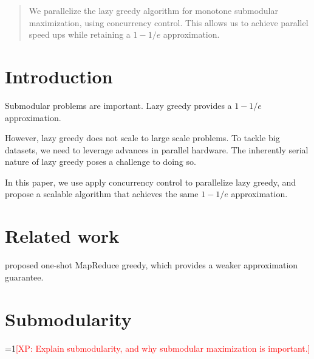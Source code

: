 \documentclass{article}
\newcommand{\Comments}{1}
\newcommand{\note}[2]{\ifnum\Comments=1\textcolor{#1}{#2}\fi}
\newcommand{\xinghao}[1]{\note{red}{[XP: #1]}}
\begin{document}
 


\begin{abstract} 
We parallelize the lazy greedy algorithm for monotone submodular maximization, using concurrency control.
This allows us to achieve parallel speed ups while retaining a $1-1/e$ approximation.
\end{abstract} 

\section{Introduction}
\label{sec:intro}
Submodular problems are important.
Lazy greedy provides a $1-1/e$ approximation.

However, lazy greedy does not scale to large scale problems.
To tackle big datasets, we need to leverage advances in parallel hardware.
The inherently serial nature of lazy greedy poses a challenge to doing so.

In this paper, we use apply concurrency control to parallelize lazy greedy, and propose a scalable algorithm that achieves the same $1-1/e$ approximation.

\section{Related work}
\label{sec:relatedwork}
\cite{Mirzasoleiman2013} proposed one-shot MapReduce greedy, which provides a weaker approximation guarantee.

\section{Submodularity}
\label{sec:submodular}
\xinghao{Explain submodularity, and why submodular maximization is important.}
\end{document}
